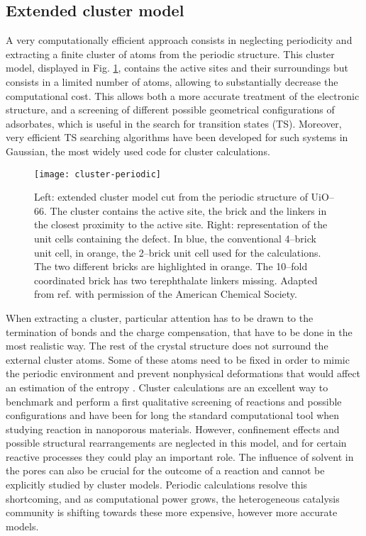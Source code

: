 \subsection*{Extended cluster model}
A very computationally efficient approach consists in neglecting periodicity and extracting a finite cluster of atoms from the periodic structure. This cluster model, displayed in Fig. \ref{fig:cluster-periodic}, contains the active sites and their surroundings but consists in a limited number of atoms, allowing to substantially decrease the computational cost. 
This allows both a more accurate treatment of the electronic structure, and a screening of different possible geometrical configurations of adsorbates, which is useful in the search for transition states (TS). Moreover, very efficient TS searching algorithms have been developed for such systems in Gaussian, the most widely used code for cluster calculations.
\begin{figure}[!htbp]
	\centering
 	\texttt{[image: cluster-periodic]}
	\caption{Left: extended cluster model cut from the periodic structure of UiO--66. The cluster contains the active site, the brick and the linkers in the closest proximity to the active site. Right: representation of the unit cells containing the defect. In blue, the conventional 4--brick unit cell, in orange, the 2--brick unit cell used for the calculations. The two different bricks are highlighted in orange. The 10--fold coordinated brick has two terephthalate linkers missing. Adapted from ref. \cite{caratelli2017nature} with permission of the American Chemical Society.}
	\label{fig:cluster-periodic}
\end{figure}
When extracting a cluster, particular attention has to be drawn to the termination of bonds and the charge compensation, that have to be done in the most realistic way. The rest of the crystal structure does not surround the external cluster atoms. Some of these atoms need to be fixed in order to mimic the periodic environment and prevent nonphysical deformations that would affect an estimation of the entropy \cite{DeWispelaere2018}.
\npar
Cluster calculations are an excellent way to benchmark and perform a first qualitative screening of reactions and possible configurations and have been for long the standard computational tool when studying reaction in nanoporous materials. However, confinement effects and possible structural rearrangements are neglected in this model, and for certain reactive processes they could play an important role. The influence of solvent in the pores can also be crucial for the outcome of a reaction and cannot be explicitly studied by cluster models. Periodic calculations resolve this shortcoming, and as computational power grows, the heterogeneous catalysis community is shifting towards these more expensive, however more accurate models. 

